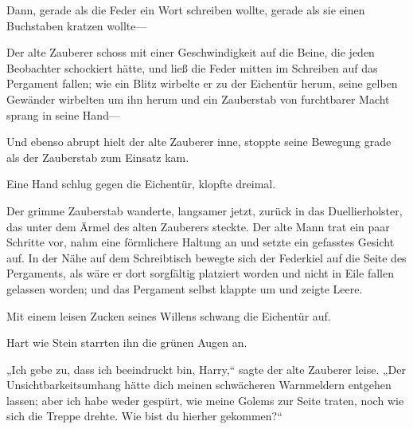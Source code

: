 Dann, gerade als die Feder ein Wort schreiben wollte, gerade als sie einen Buchstaben kratzen wollte—

Der alte Zauberer schoss mit einer Geschwindigkeit auf die Beine, die jeden Beobachter schockiert hätte, und ließ die Feder mitten im Schreiben auf das Pergament fallen; wie ein Blitz wirbelte er zu der Eichentür herum, seine gelben Gewänder wirbelten um ihn herum und ein Zauberstab von furchtbarer Macht sprang in seine Hand—

Und ebenso abrupt hielt der alte Zauberer inne, stoppte seine Bewegung grade als der Zauberstab zum Einsatz kam.

Eine Hand schlug gegen die Eichentür, klopfte dreimal.

Der grimme Zauberstab wanderte, langsamer jetzt, zurück in das Duellierholster, das unter dem Ärmel des alten Zauberers steckte. Der alte Mann trat ein paar Schritte vor, nahm eine förmlichere Haltung an und setzte ein gefasstes Gesicht auf. In der Nähe auf dem Schreibtisch bewegte sich der Federkiel auf die Seite des Pergaments, als wäre er dort sorgfältig platziert worden und nicht in Eile fallen gelassen worden; und das Pergament selbst klappte um und zeigte Leere.

Mit einem leisen Zucken seines Willens schwang die Eichentür auf.

Hart wie Stein starrten ihn die grünen Augen an.

„Ich gebe zu, dass ich beeindruckt bin, Harry,“ sagte der alte Zauberer leise. „Der Unsichtbarkeitsumhang hätte dich meinen schwächeren Warnmeldern entgehen lassen; aber ich habe weder gespürt, wie meine Golems zur Seite traten, noch wie sich die Treppe drehte. Wie bist du hierher gekommen?“

